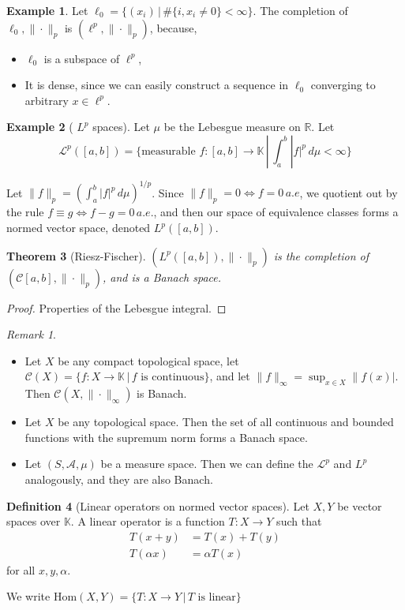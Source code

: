 \documentclass[10pt, reqno, oneside]{amsart}
\theoremstyle{plain}%
\newtheorem{thm}{Theorem}[section]
\theoremstyle{definition}
\newtheorem{defn}[thm]{Definition}
\newtheorem{exmp}[thm]{Example}
\theoremstyle{remark}
\newtheorem*{rem}{Remark}
\newcommand{\R}{\mathbb{R}}
\newcommand{\K}{\mathbb{K}}
\begin{document}
\begin{exmp}
	Let $\ell_0 = \{ (x_i) \, | \, \# \{ i, x_i \neq 0 \} < \infty \}$.  The completion of $\ell_0, \| \cdot \|_p$ is $(\ell^p, \| \cdot \|_p )$, because,
	\begin{itemize}
		\item $\ell_0$ is a subspace of $\ell^p$,
		\item It is dense, since we can easily construct a sequence in $\ell_0$ converging to arbitrary $x \in \ell^p$.
	\end{itemize}
\end{exmp}
\begin{exmp}[ $L^p$ spaces]
	Let $\mu$ be the Lebesgue measure on $\R$.  Let \[
		\mathcal{L}^p([a,b]) = \{ \text{measurable } f: [a,b] \rightarrow \K \, | \, \int_a^b |f|^p \, d \mu < \infty \}
	\]
	
	Let $\| f \|_p = \left( \int_a^b |f|^p \, d \mu \right)^{1/p}$.  Since $\| f \|_p = 0 \iff f = 0 \, a.e$, we quotient out by the rule $f \equiv g \iff f - g = 0 \, a.e.$, and then our space of equivalence classes forms a normed vector space, denoted $L^p([a,b])$.
\end{exmp}

\begin{thm}[Riesz-Fischer] $(L^p([a,b]), \| \cdot \|_p )$ is the completion of $(\mathcal{C}[a,b], \| \cdot \|_p )$, and is a Banach space.
\end{thm}
\begin{proof}
	Properties of the Lebesgue integral.
\end{proof}

\begin{rem}{\ }
	\begin{itemize}
		\item Let $X$ be any compact topological space, let $\mathcal{C}(X) = \{ f : X \rightarrow \K \, | \, \text{$f$ is continuous} \}$, and let $\|f \|_\infty = \sup_{x \in X} \|f(x)|$.  Then $\mathcal{C}(X, \| \cdot \|_\infty)$ is Banach.  
		\item Let $X$ be any topological space.  Then the set of all continuous and bounded functions with the supremum norm forms a Banach space.
		\item Let $(S, \mathcal{A}, \mu)$ be a measure space.  Then we can define the $\mathcal{L}^p$ and $L^p$ analogously, and they are also Banach.
	\end{itemize}
\end{rem}

\begin{defn}[Linear operators on normed vector spaces]
	Let $X,Y$ be vector spaces over $\K$.  A linear operator is a function $T:X \rightarrow Y$ such that 
	\begin{align*}
		T(x+y) &= T(x) + T(y) \\
		T(\alpha x) &= \alpha T(x)
	\end{align*}
	for all $x,y,\alpha$.

	We write $\text{Hom}(X,Y) = \{ T: X \rightarrow Y \, | \, \text{$T$ is linear} \}$
\end{defn}
\end{document}
